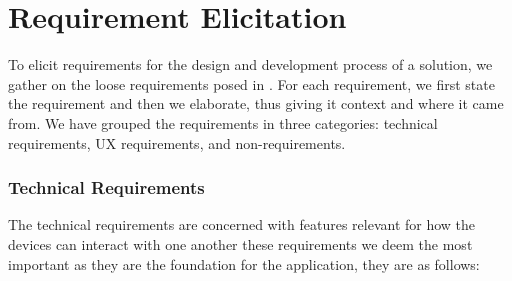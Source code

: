 \chapter{Requirement Elicitation}\label{cha:requirement_elicitation}
To elicit requirements for the design and development process of a solution, we gather on the loose requirements posed in .
For each requirement, we first state the requirement and then we elaborate, thus giving it context and where it came from.
We have grouped the requirements in three categories: technical requirements, \ac{UX} requirements, and non-requirements.

\subsection*{Technical Requirements}
The technical requirements are concerned with features relevant for how the devices can interact with one another these requirements we deem the most important as they are the foundation for the application, they are as follows:

